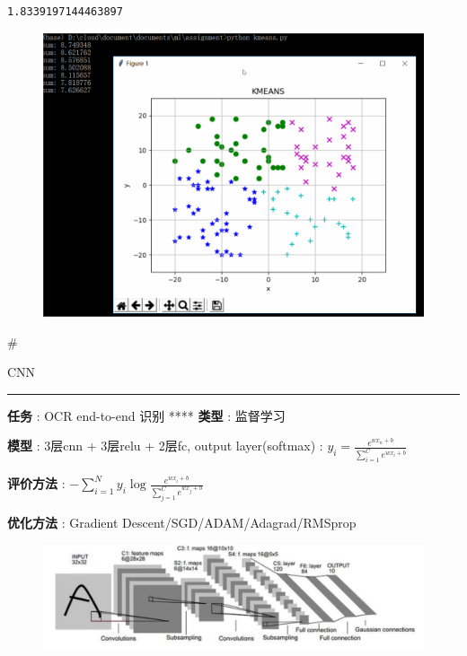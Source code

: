 \documentclass[11pt]{article}
\makeatletter
\def\maxwidth{\ifdim\Gin@nat@width>\linewidth\linewidth
    \else\Gin@nat@width\fi}
\let\Oldincludegraphics\includegraphics
\renewcommand{\includegraphics}[1]{\Oldincludegraphics[width=.8\maxwidth]{#1}}
\makeatother
\begin{document}
    \begin{Verbatim}[commandchars=\\\{\}]
1.8339197144463897

    \end{Verbatim}

    \begin{figure}
\centering
\includegraphics{assignment/kmeans/kmeans.gif}
\caption{}
\end{figure}

    \#

CNN

\begin{center}\rule{0.5\linewidth}{\linethickness}\end{center}

\textbf{任务} : OCR end-to-end 识别 **** \textbf{类型} : 监督学习

\textbf{模型} : 3层cnn + 3层relu + 2层fc, output layer(softmax) :
\({y_i} = \frac{{{e^{w{x_n} + b}}}}{{\sum\limits_{i = 1}^C {{e^{w{x_i} + b}}} }}\)

\textbf{评价方法} :
\(- \sum\limits_{i = 1}^N {{y_i}\log \frac{{{e^{w{x_i} + b}}}}{{\sum\limits_{j = 1}^C {{e^{w{x_j} + b}}} }}}\)

\textbf{优化方法} : Gradient Descent/SGD/ADAM/Adagrad/RMSprop

\begin{figure}
\centering
\includegraphics{lenet.png}
\caption{}
\end{figure}
\end{document}
